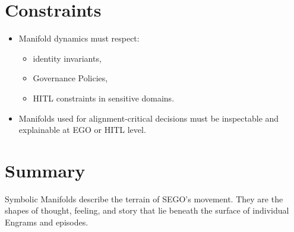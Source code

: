 \section{Constraints}

\begin{itemize}
    \item Manifold dynamics must respect:
          \begin{itemize}
              \item identity invariants,
              \item Governance Policies,
              \item HITL constraints in sensitive domains.
          \end{itemize}
    \item Manifolds used for alignment-critical decisions must be
          inspectable and explainable at EGO or HITL level.
\end{itemize}

\section{Summary}

Symbolic Manifolds describe the terrain of SEGO’s movement. They are the
shapes of thought, feeling, and story that lie beneath the surface of
individual Engrams and episodes.
